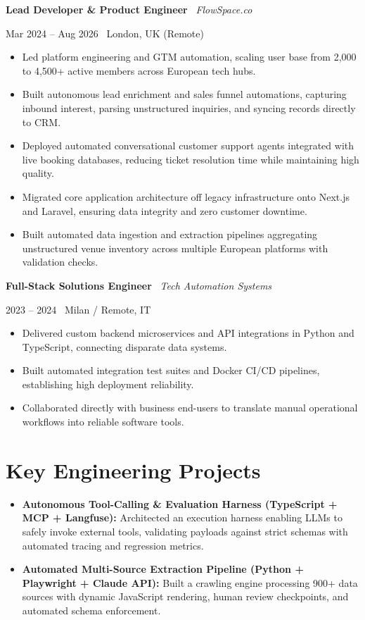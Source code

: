 \documentclass[a4paper,10pt]{article}
\newcommand{\role}[4]{%
  \vspace{2pt}\noindent
  \begin{minipage}[t]{0.70\textwidth}\raggedright\textbf{#1} \textbullet\ \textit{#3}\end{minipage}%
  \hfill
  \begin{minipage}[t]{0.28\textwidth}\raggedleft\footnotesize\color{gray}#2 \textbullet\ #4\end{minipage}%
  \vspace{1pt}%
}
\begin{document}
\vspace{3pt}
\role{Lead Developer \& Product Engineer}{Mar 2024 -- Aug 2026}{FlowSpace.co}{London, UK (Remote)}
\begin{itemize}
  \item Led platform engineering and GTM automation, scaling user base from 2,000 to 4,500+ active members across European tech hubs.
  \item Built autonomous lead enrichment and sales funnel automations, capturing inbound interest, parsing unstructured inquiries, and syncing records directly to CRM.
  \item Deployed automated conversational customer support agents integrated with live booking databases, reducing ticket resolution time while maintaining high quality.
  \item Migrated core application architecture off legacy infrastructure onto Next.js and Laravel, ensuring data integrity and zero customer downtime.
  \item Built automated data ingestion and extraction pipelines aggregating unstructured venue inventory across multiple European platforms with validation checks.
\end{itemize}

\vspace{3pt}
\role{Full-Stack Solutions Engineer}{2023 -- 2024}{Tech Automation Systems}{Milan / Remote, IT}
\begin{itemize}
  \item Delivered custom backend microservices and API integrations in Python and TypeScript, connecting disparate data systems.
  \item Built automated integration test suites and Docker CI/CD pipelines, establishing high deployment reliability.
  \item Collaborated directly with business end-users to translate manual operational workflows into reliable software tools.
\end{itemize}

\section{Key Engineering Projects}
\begin{itemize}
  \item \textbf{Autonomous Tool-Calling \& Evaluation Harness (TypeScript + MCP + Langfuse):} Architected an execution harness enabling LLMs to safely invoke external tools, validating payloads against strict schemas with automated tracing and regression metrics.
  \item \textbf{Automated Multi-Source Extraction Pipeline (Python + Playwright + Claude API):} Built a crawling engine processing 900+ data sources with dynamic JavaScript rendering, human review checkpoints, and automated schema enforcement.
\end{itemize}
\end{document}
